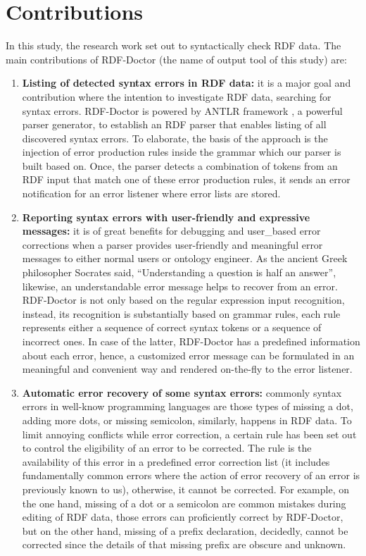 

\section {Contributions}
In this study, the research work set out to syntactically check RDF data. 
The main contributions of RDF-Doctor (the name of output tool of this study) are:
\begin{enumerate}
	\item  {\bf Listing of detected syntax errors in RDF data:} it is a major goal and contribution where the intention to investigate RDF data, searching for syntax errors. RDF-Doctor is powered by ANTLR framework \cite{ANTLR:Website:Online}, a powerful parser generator, to establish an RDF parser that enables listing of all discovered syntax errors. To elaborate, the basis of the approach is the injection of error production rules inside the grammar which our parser is built based on. Once, the parser detects a combination of tokens from an RDF input that match one of these error production rules, it sends an error notification for an error listener where error lists are stored.
	\item {\bf Reporting syntax errors with user-friendly and expressive messages:} it is of great benefits for debugging and user\_based error corrections when a parser provides user-friendly and meaningful error messages to either normal users or ontology engineer. As the ancient Greek philosopher Socrates said, “Understanding a question is half an answer”\cite{Socrates:quote:Online}, likewise, an understandable error message helps to recover from an error.  RDF-Doctor is not only based on the regular expression input recognition, instead, its recognition is substantially based on grammar rules, each rule represents either a sequence of correct syntax tokens or a sequence of incorrect ones. In case of the latter, RDF-Doctor has a predefined information about each error, hence,  a customized error message can be formulated in an meaningful and convenient way and rendered on-the-fly to the error listener.  
	\item {\bf Automatic error recovery of some syntax errors:} commonly syntax errors in well-know programming languages are those types of missing a dot, adding more dots, or missing semicolon, similarly, happens in RDF data. To limit annoying conflicts while error correction, a certain rule has been set out to control the eligibility of an error to be corrected. The rule is the availability of this error in a predefined error correction list (it includes fundamentally common errors where the action of error recovery of an error is previously known to us), otherwise, it cannot be corrected. For example, on the one hand,  missing of a dot or a semicolon are common mistakes during editing of RDF data, those errors can proficiently correct by RDF-Doctor, but on the other hand, missing of a prefix declaration, decidedly, cannot be corrected since the details of that missing prefix are obscure and unknown.     
\end{enumerate}

